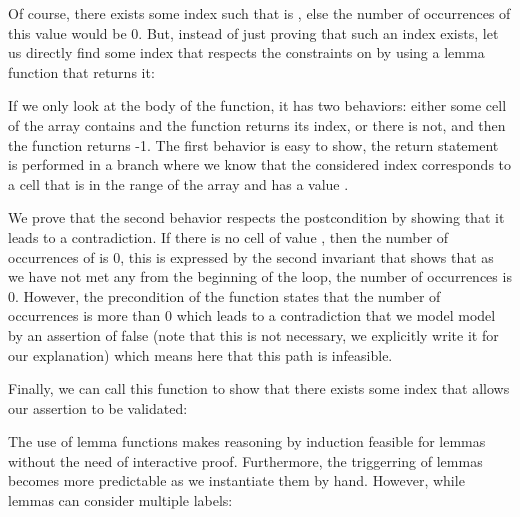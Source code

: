 


Of course, there exists some index  such that 
is , else the number of occurrences of this value would be $0$.
But, instead of just proving that such an index exists, let us directly find
some index that respects the constraints on  by using a lemma
function that returns it:






If we only look at the body of the function, it has two behaviors: either some
cell of the array contains  and the function returns its index, or
there is not, and then the function returns -1. The first behavior is easy to
show, the return statement is performed in a branch where we know that the
considered index corresponds to a cell that is in the range of the array and has
a value .



We prove that the second behavior respects the postcondition by showing that it
leads to a contradiction. If there is no cell of value , then
the number of occurrences of  is 0, this is expressed by the
second invariant that shows that as we have not met any  from
the beginning of the loop,
the number of occurrences is 0. However, the precondition of the
function states that the number of occurrences is more than $0$ which leads to
a contradiction that we model model by an assertion of false (note that this is
not necessary, we explicitly write it for our explanation) which means here that
this path is infeasible.



Finally, we can call this function to show that there exists some index that
allows our assertion to be validated:






The use of lemma functions makes reasoning by induction feasible for lemmas
without the need of interactive proof. Furthermore, the triggerring of lemmas
becomes more predictable as we instantiate them by hand. However, while lemmas
can consider multiple labels:



